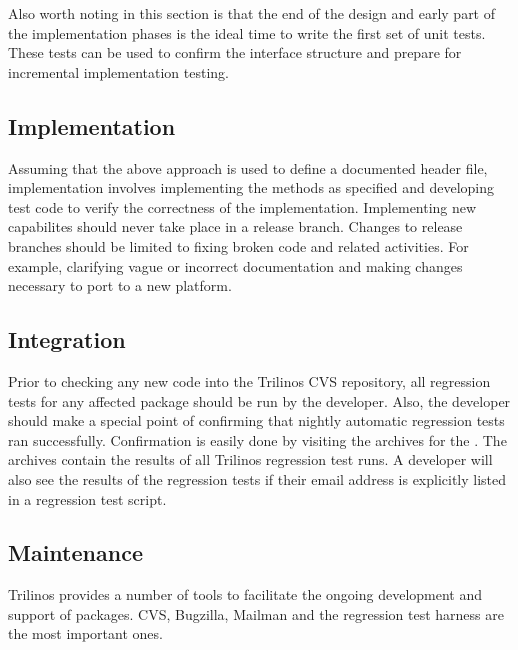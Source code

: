 \documentclass[12pt,strict]{TrilinosDevGuide}
\begin{document}
Also worth noting in this section is that the end of the design and
early part of the implementation phases is the ideal time to
write the first set of unit tests.  These tests can be used to confirm
the interface structure and prepare for incremental implementation testing.

\subsection{Implementation}
Assuming that the above approach is used to define a documented header
file, implementation involves implementing the methods as specified
and developing test code to verify the correctness of the implementation.
Implementing new capabilites should never take place in a release branch.  
Changes to release branches should be limited to fixing broken code and 
related activities.  For example, clarifying vague or incorrect documentation 
and making changes necessary to port to a new platform.

\subsection{Integration}
Prior to checking any new code into the Trilinos CVS repository, all
regression tests for any affected package should be run by the
developer.  Also, the developer should make a special point of
confirming that nightly automatic regression tests ran successfully.
Confirmation is easily done by visiting the archives for the 
.  The archives
contain the results of all Trilinos regression test runs.  
A developer will also see the results of the regression tests if their 
email address is explicitly listed in a regression test script.


\subsection{Maintenance}
Trilinos provides a number of tools to facilitate the ongoing
development and support of packages.  CVS, Bugzilla, Mailman and the
regression test harness are the most important ones.
\end{document}
